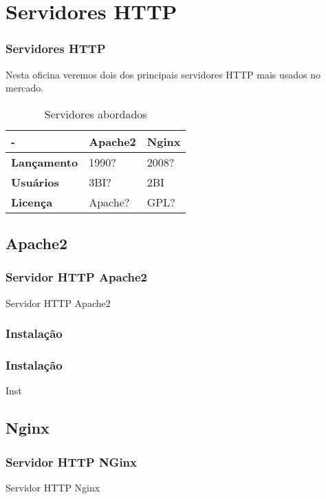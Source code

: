 \documentclass{beamer}
\begin{document}
\section{Servidores HTTP}
\begin{frame}
\frametitle{Servidores HTTP}
Nesta oficina veremos dois dos principais servidores HTTP mais usados no mercado.

\begin{table}
\begin{tabular}{l l l}
\toprule
- & \textbf{Apache2} & \textbf{Nginx}\\
\midrule
\textbf{Lançamento} & 1990? & 2008? \\
\textbf{Usuários}   & 3BI? & 2BI \\
\textbf{Licença}    & Apache? & GPL? \\
\bottomrule
\end{tabular}
\caption{Servidores abordados}
\end{table}
\end{frame}

\subsection{Apache2}
\begin{frame}
\frametitle{Servidor HTTP Apache2}
Servidor HTTP Apache2
\end{frame}

\subsubsection{Instalação}
\begin{frame}
\frametitle{Instalação}

Inst

\end{frame}

\subsection{Nginx}
\begin{frame}
\frametitle{Servidor HTTP NGinx}
Servidor HTTP Nginx
\end{frame}

\end{document}
